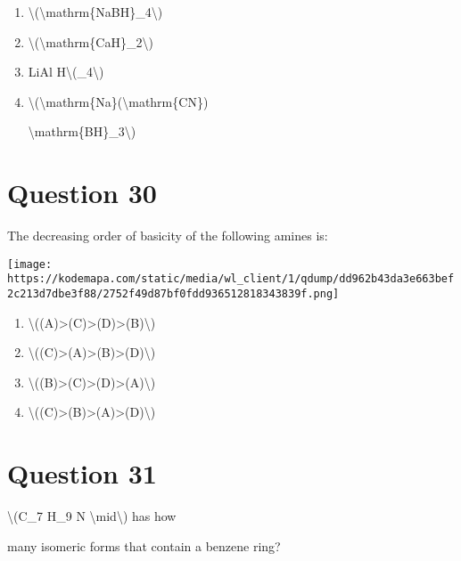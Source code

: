 \documentclass{article}
\begin{document}
\begin{enumerate}[label=(\alph*)]
\item \textbackslash(\textbackslash mathrm\{NaBH\}\_4\textbackslash)


\item \textbackslash(\textbackslash mathrm\{CaH\}\_2\textbackslash)


\item LiAl H\textbackslash(\_4\textbackslash)


\item \textbackslash(\textbackslash mathrm\{Na\}(\textbackslash mathrm\{CN\})

\textbackslash mathrm\{BH\}\_3\textbackslash)


\end{enumerate}
\newpage
\section*{Question 30}
The decreasing order of basicity of the following amines is:



\texttt{[image: https://kodemapa.com/static/media/wl\_client/1/qdump/dd962b43da3e663bef2c213d7dbe3f88/2752f49d87bf0fdd936512818343839f.png]}\\


\begin{enumerate}[label=(\alph*)]
\item \textbackslash((A)\textgreater(C)\textgreater(D)\textgreater(B)\textbackslash)


\item \textbackslash((C)\textgreater(A)\textgreater(B)\textgreater(D)\textbackslash)


\item \textbackslash((B)\textgreater(C)\textgreater(D)\textgreater(A)\textbackslash)


\item \textbackslash((C)\textgreater(B)\textgreater(A)\textgreater(D)\textbackslash)


\end{enumerate}
\newpage
\section*{Question 31}
\textbackslash(C\_7 H\_9 N \textbackslash mid\textbackslash) has how

many isomeric forms that contain a benzene ring?


\begin{enumerate}[label=(\alph*)]
\end{enumerate}
\newpage
\end{document}
